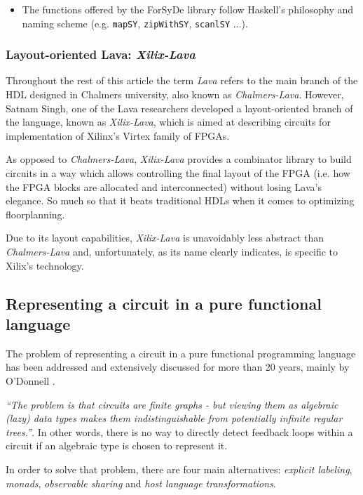\documentclass[a4paper,twoside,11pt]{article}
\begin{document}
\begin{body}
\begin{itemize}
  \item The functions offered by the ForSyDe library follow Haskell's
    philosophy and naming scheme (e.g. \texttt{mapSY}, \texttt{zipWithSY},
    \texttt{scanlSY} $\dots$).
\end{itemize}

\subsubsection{Layout-oriented Lava: \textit{Xilix-Lava}}
Throughout the rest of this article the term \textit{Lava} refers to the main
branch of the HDL designed in Chalmers university, also known as
\textit{Chalmers-Lava}. However, Satnam Singh, one of the Lava researchers
developed a layout-oriented branch of the language, known as
\textit{Xilix-Lava}, which is aimed at describing circuits for implementation
of Xilinx's Virtex family of FPGAs\cite{fpga}.

As opposed to \textit{Chalmers-Lava}, \textit{Xilix-Lava} provides a
combinator library to build circuits in a way which allows controlling the
final layout of the FPGA (i.e. how the FPGA blocks are allocated and
interconnected) without losing Lava's elegance. So much so that it beats
traditional HDLs when it comes to optimizing floorplanning\cite{sorter}.

Due to its layout capabilities, \textit{Xilix-Lava} is unavoidably
less abstract than \textit{Chalmers-Lava} and, unfortunately, as its name
clearly indicates, is specific to Xilix's technology.
 
\subsection{Representing a circuit in a pure functional language}
The problem of representing a circuit in a pure functional
programming language has been addressed and extensively discussed for
more than 20 years, mainly by O'Donnell
\cite{recursion,netlists,hwrec,osharing,panchitos,hydra:th}.


\textit{``The problem is that circuits are finite graphs - but viewing
  them as algebraic (lazy) data types makes them indistinguishable
  from potentially infinite regular trees.''}\cite{osharing}. In other
words, there is no way to directly detect feedback loops within a
circuit if an algebraic type is chosen to represent it.

In order to solve that problem, there are four main alternatives:
\textit{explicit labeling}, \textit{monads}, \textit{observable
  sharing} and \textit{host language transformations}.




\end{body}
\end{document}
